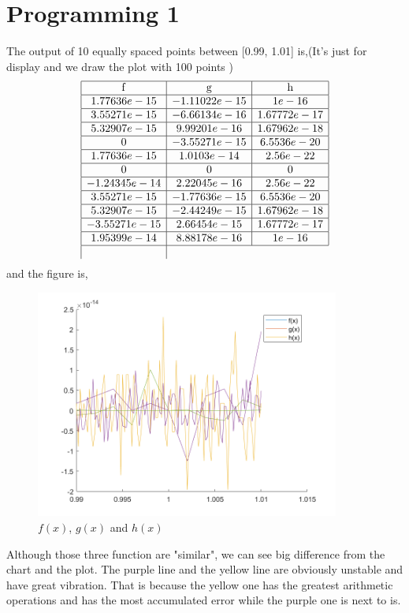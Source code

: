 \documentclass[UTF8]{ctexart}
\begin{document}
 \section*{Programming 1}
 The output of 10 equally spaced points between [0.99, 1.01] is,(It's just for display and we draw the plot with 100 points )
 \begin{equation}
    \begin{array}{|c|c|c|}
        \hline \mathrm{f} & \mathrm{g} & \mathrm{h} \\
         \hline1.77636e-15 &-1.11022e-15 &1e-16\\
        \hline3.55271e-15 &-6.66134e-16 &1.67772e-17\\
        \hline5.32907e-15& 9.99201e-16 &1.67962e-18\\
        \hline0 &-3.55271e-15& 6.5536e-20\\
        \hline1.77636e-15& 1.0103e-14 &2.56e-22\\
        \hline0 &0 &0\\
        \hline-1.24345e-14 &2.22045e-16& 2.56e-22\\
        \hline3.55271e-15& -1.77636e-15& 6.5536e-20\\
        \hline5.32907e-15& -2.44249e-15 &1.67962e-18\\
        \hline-3.55271e-15&2.66454e-15& 1.67772e-17\\
        \hline1.95399e-14 &8.88178e-16& 1e-16\\
        \hline
    \nonumber
    \end{array}
 \end{equation}
 and the figure is,\\
 \begin{figure}[htp]
    \centering
    \includegraphics[width=10cm]{Aplot.png}
    \caption{$f(x)$, $g(x)$ and $h(x)$}
    \label{fig:1L}
\end{figure}
\indent Although those three function are "similar", we can see big difference from the chart and the plot. The purple line and the yellow line are obviously unstable and have great vibration. That is because the yellow one has the greatest arithmetic operations and has the most accumulated error while the purple one is next to is.
\end{document}
